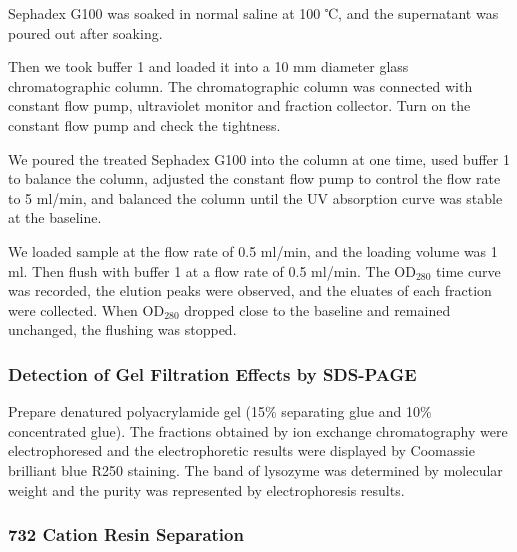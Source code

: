 Sephadex G100 was soaked in normal saline at 100 ℃, and the supernatant
was poured out after soaking.

Then we took buffer 1 and loaded it into a 10 mm diameter glass
chromatographic column. The chromatographic column was connected with
constant flow pump, ultraviolet monitor and fraction collector. Turn on
the constant flow pump and check the tightness.

We poured the treated Sephadex G100 into the column at one time, used buffer 1
to balance the column, adjusted the constant flow pump to
control the flow rate to 5 ml/min, and balanced the column until the
UV absorption curve was stable at the baseline.

We loaded sample at the flow rate of 0.5 ml/min, and the loading volume was 1 ml. Then flush with buffer 1 at a flow rate of 0.5 ml/min. The $\mathrm{OD_{280}}$ time curve was recorded, the elution peaks were observed,
and the eluates of each fraction were collected. When $\mathrm{OD_{280}}$ dropped
close to the baseline and remained unchanged, the flushing was stopped.



\hypertarget{header-n23}{%
\subsubsection{Detection of Gel Filtration Effects by SDS-PAGE \citep{SDSfor}}}

Prepare denatured polyacrylamide gel (15\% separating glue and 10\%
concentrated glue). The fractions obtained by ion exchange
chromatography were electrophoresed and the electrophoretic results were
displayed by Coomassie brilliant blue R250 staining. The band of lysozyme was determined by molecular weight and the purity  was represented by electrophoresis results. 



\subsubsection{732 Cation Resin Separation \citep{Hu2015,Lin2002,732}}

